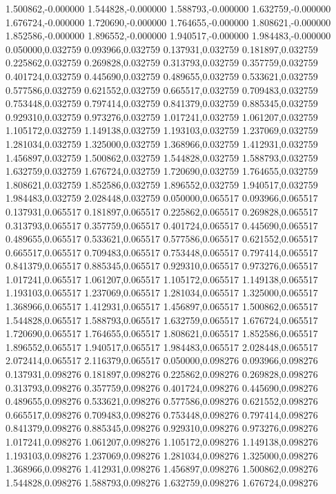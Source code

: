 1.500862,-0.000000
1.544828,-0.000000
1.588793,-0.000000
1.632759,-0.000000
1.676724,-0.000000
1.720690,-0.000000
1.764655,-0.000000
1.808621,-0.000000
1.852586,-0.000000
1.896552,-0.000000
1.940517,-0.000000
1.984483,-0.000000
0.050000,0.032759
0.093966,0.032759
0.137931,0.032759
0.181897,0.032759
0.225862,0.032759
0.269828,0.032759
0.313793,0.032759
0.357759,0.032759
0.401724,0.032759
0.445690,0.032759
0.489655,0.032759
0.533621,0.032759
0.577586,0.032759
0.621552,0.032759
0.665517,0.032759
0.709483,0.032759
0.753448,0.032759
0.797414,0.032759
0.841379,0.032759
0.885345,0.032759
0.929310,0.032759
0.973276,0.032759
1.017241,0.032759
1.061207,0.032759
1.105172,0.032759
1.149138,0.032759
1.193103,0.032759
1.237069,0.032759
1.281034,0.032759
1.325000,0.032759
1.368966,0.032759
1.412931,0.032759
1.456897,0.032759
1.500862,0.032759
1.544828,0.032759
1.588793,0.032759
1.632759,0.032759
1.676724,0.032759
1.720690,0.032759
1.764655,0.032759
1.808621,0.032759
1.852586,0.032759
1.896552,0.032759
1.940517,0.032759
1.984483,0.032759
2.028448,0.032759
0.050000,0.065517
0.093966,0.065517
0.137931,0.065517
0.181897,0.065517
0.225862,0.065517
0.269828,0.065517
0.313793,0.065517
0.357759,0.065517
0.401724,0.065517
0.445690,0.065517
0.489655,0.065517
0.533621,0.065517
0.577586,0.065517
0.621552,0.065517
0.665517,0.065517
0.709483,0.065517
0.753448,0.065517
0.797414,0.065517
0.841379,0.065517
0.885345,0.065517
0.929310,0.065517
0.973276,0.065517
1.017241,0.065517
1.061207,0.065517
1.105172,0.065517
1.149138,0.065517
1.193103,0.065517
1.237069,0.065517
1.281034,0.065517
1.325000,0.065517
1.368966,0.065517
1.412931,0.065517
1.456897,0.065517
1.500862,0.065517
1.544828,0.065517
1.588793,0.065517
1.632759,0.065517
1.676724,0.065517
1.720690,0.065517
1.764655,0.065517
1.808621,0.065517
1.852586,0.065517
1.896552,0.065517
1.940517,0.065517
1.984483,0.065517
2.028448,0.065517
2.072414,0.065517
2.116379,0.065517
0.050000,0.098276
0.093966,0.098276
0.137931,0.098276
0.181897,0.098276
0.225862,0.098276
0.269828,0.098276
0.313793,0.098276
0.357759,0.098276
0.401724,0.098276
0.445690,0.098276
0.489655,0.098276
0.533621,0.098276
0.577586,0.098276
0.621552,0.098276
0.665517,0.098276
0.709483,0.098276
0.753448,0.098276
0.797414,0.098276
0.841379,0.098276
0.885345,0.098276
0.929310,0.098276
0.973276,0.098276
1.017241,0.098276
1.061207,0.098276
1.105172,0.098276
1.149138,0.098276
1.193103,0.098276
1.237069,0.098276
1.281034,0.098276
1.325000,0.098276
1.368966,0.098276
1.412931,0.098276
1.456897,0.098276
1.500862,0.098276
1.544828,0.098276
1.588793,0.098276
1.632759,0.098276
1.676724,0.098276
